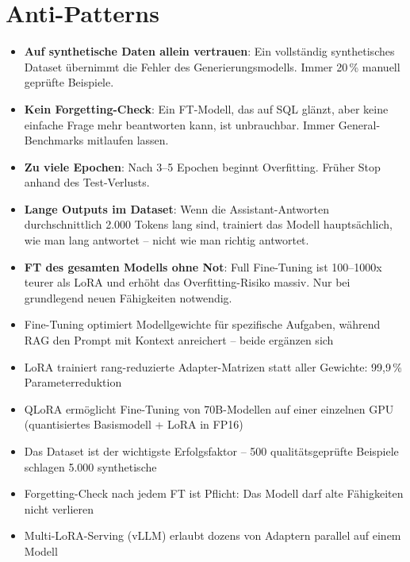 \section{Anti-Patterns}

\begin{itemize}[leftmargin=*]
    \item \textbf{Auf synthetische Daten allein vertrauen}: Ein vollständig synthetisches Dataset übernimmt die Fehler des Generierungsmodells. Immer 20\,\% manuell geprüfte Beispiele.
    \item \textbf{Kein Forgetting-Check}: Ein FT-Modell, das auf SQL glänzt, aber keine einfache Frage mehr beantworten kann, ist unbrauchbar. Immer General-Benchmarks mitlaufen lassen.
    \item \textbf{Zu viele Epochen}: Nach 3--5 Epochen beginnt Overfitting. Früher Stop anhand des Test-Verlusts.
    \item \textbf{Lange Outputs im Dataset}: Wenn die Assistant-Antworten durchschnittlich 2.000 Tokens lang sind, trainiert das Modell hauptsächlich, wie man lang antwortet -- nicht wie man richtig antwortet.
    \item \textbf{FT des gesamten Modells ohne Not}: Full Fine-Tuning ist 100--1000x teurer als LoRA und erhöht das Overfitting-Risiko massiv. Nur bei grundlegend neuen Fähigkeiten notwendig.
\end{itemize}

\begin{zusammenfassungEnv}
\begin{itemize}[leftmargin=*]
    \item Fine-Tuning optimiert Modellgewichte für spezifische Aufgaben, während RAG den Prompt mit Kontext anreichert -- beide ergänzen sich
    \item LoRA trainiert rang-reduzierte Adapter-Matrizen statt aller Gewichte: 99,9\,\% Parameterreduktion
    \item QLoRA ermöglicht Fine-Tuning von 70B-Modellen auf einer einzelnen GPU (quantisiertes Basismodell + LoRA in FP16)
    \item Das Dataset ist der wichtigste Erfolgsfaktor -- 500 qualitätsgeprüfte Beispiele schlagen 5.000 synthetische
    \item Forgetting-Check nach jedem FT ist Pflicht: Das Modell darf alte Fähigkeiten nicht verlieren
    \item Multi-LoRA-Serving (vLLM) erlaubt dozens von Adaptern parallel auf einem Modell
\end{itemize}
\end{zusammenfassungEnv}




